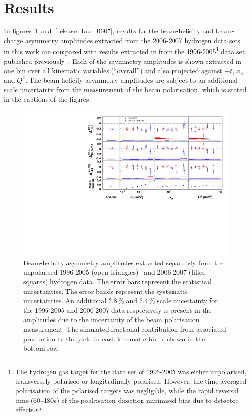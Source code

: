 \documentclass[11pt,a4paper]{article}
\begin{document}
\section{Results}
In figures~\ref{release_bsa_0607} and~\ref{release_bca_0607}, results for the beam-helicity and beam-charge asymmetry amplitudes extracted from the 2006-2007 hydrogen data sets in this work are compared with results extracted in  from the 1996-2005\footnote{The hydrogen gas target for the data set of 1996-2005 was either unpolarised, transversely polarised or longitudinally polarised. However, the time-averaged polarisation of the polarised targets was negligible, while the rapid reversal time (60--180s) of the poalrisation direction minimised bias due to detector effects.} data set published previously~\cite{Air09}. Each of the asymmetry amplitudes is shown extracted in one bin over all kinematic variables (``overall'') and also projected against $-t$, $x_{\textrm{B}}$ and $Q^{2}$. The beam-helicity asymmetry amplitudes are subject to an additional scale uncertainty from the measurement of the beam polarisation, which is stated in the captions of the figures.
\begin{figure}
\begin{center}
\includegraphics[width=15cm,keepaspectratio]{bsa_sep}
  \caption{Beam-helicity asymmetry amplitudes extracted separately from
the unpolarised 1996-2005 (open triangles)~\cite{Air09} and 2006-2007 (filled squares)
hydrogen data. The error bars represent the statistical uncertainties. The error bands represent the systematic uncertainties.
An additional 2.8\,\% and 3.4\,\% scale uncertainty for the 1996-2005 and
2006-2007 data respectively is present in the amplitudes due to the uncertainty of
the beam polarisation measurement. The simulated fractional contribution from associated production to the yield in each kinematic bin is shown in the bottom row.}
 \label{release_bsa_0607}
\end{center}
 \end{figure}
\end{document}
